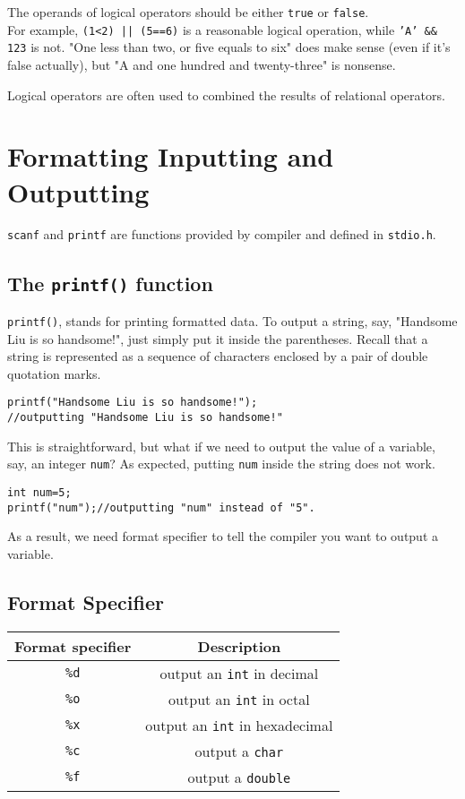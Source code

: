 \documentclass{report}
\begin{document}
    The operands of logical operators should be either \texttt{true} or \texttt{false}. \\
    For example, \texttt{(1<2) || (5==6)} is a reasonable logical operation, while \texttt{'A' \&\& 123} is not. "One less than two, or five equals to six" does make sense (even if it's false actually), but "A and one hundred and twenty-three" is nonsense.

    Logical operators are often used to combined the results of relational operators.
    
\section{Formatting Inputting and Outputting}
    \texttt{scanf} and \texttt{printf} are functions provided by compiler and defined in \texttt{stdio.h}.
    \subsection{The \texttt{printf()} function}
    \texttt{printf()}, stands for printing formatted data. To output a string, say, "Handsome Liu is so handsome!", just simply put it inside the parentheses. Recall that a string is represented as a sequence of characters enclosed by a pair of double quotation marks.
\begin{lstlisting}[style=CStyle]
printf("Handsome Liu is so handsome!");
//outputting "Handsome Liu is so handsome!"
\end{lstlisting}
    This is straightforward, but what if we need to output the value of a variable, say, an integer \texttt{num}? As expected, putting \texttt{num} inside the string does not work.
\begin{lstlisting}[style=CStyle]
int num=5;
printf("num");//outputting "num" instead of "5".
\end{lstlisting}
    As a result, we need format specifier to tell the compiler you want to output a variable.
    \subsection{Format Specifier}
    \begin{tabular}{|c|c|}
    Format specifier    &   Description\\
    \hline
    \texttt{\%d}        &   output an \texttt{int} in decimal\\
    \texttt{\%o}        &   output an \texttt{int} in octal\\
    \texttt{\%x}        &   output an \texttt{int} in hexadecimal\\
    \texttt{\%c}        &   output a \texttt{char}\\
    \texttt{\%f}        &   output a \texttt{double}\\
    \end{tabular}
    
\end{document}
